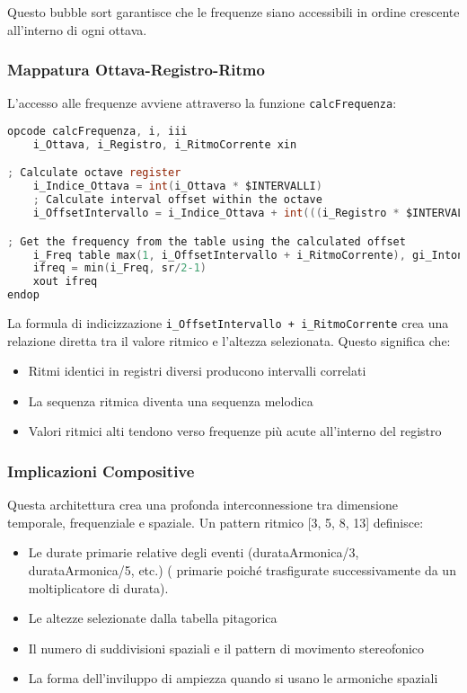 Questo bubble sort garantisce che le frequenze siano accessibili in ordine crescente all'interno di ogni ottava.
\subsubsection{Mappatura Ottava-Registro-Ritmo}
L'accesso alle frequenze avviene attraverso la funzione \texttt{calcFrequenza}:

\begin{lstlisting}[language=C]
opcode calcFrequenza, i, iii
    i_Ottava, i_Registro, i_RitmoCorrente xin

; Calculate octave register
    i_Indice_Ottava = int(i_Ottava * $INTERVALLI)
    ; Calculate interval offset within the octave
    i_OffsetIntervallo = i_Indice_Ottava + int(((i_Registro * $INTERVALLI) / $REGISTRI))

; Get the frequency from the table using the calculated offset
    i_Freq table max(1, i_OffsetIntervallo + i_RitmoCorrente), gi_Intonazione
    ifreq = min(i_Freq, sr/2-1)
    xout ifreq
endop
\end{lstlisting}

La formula di indicizzazione \texttt{i\_OffsetIntervallo + i\_RitmoCorrente} crea una relazione diretta tra il valore ritmico e l'altezza selezionata. Questo significa che:

\begin{itemize}
 \item Ritmi identici in registri diversi producono intervalli correlati
 \item La sequenza ritmica diventa una sequenza melodica
 \item Valori ritmici alti tendono verso frequenze più acute all'interno del registro
\end{itemize}
\subsubsection{Implicazioni Compositive}
Questa architettura crea una profonda interconnessione tra dimensione temporale, frequenziale e spaziale. Un pattern ritmico [3, 5, 8, 13] definisce:
\begin{itemize}
 \item Le durate primarie relative degli eventi (durataArmonica/3, durataArmonica/5, etc.) ( primarie poiché trasfigurate successivamente da un moltiplicatore di durata).
 \item Le altezze selezionate dalla tabella pitagorica
 \item Il numero di suddivisioni spaziali e il pattern di movimento stereofonico
 \item La forma dell'inviluppo di ampiezza quando si usano le armoniche spaziali
\end{itemize}

